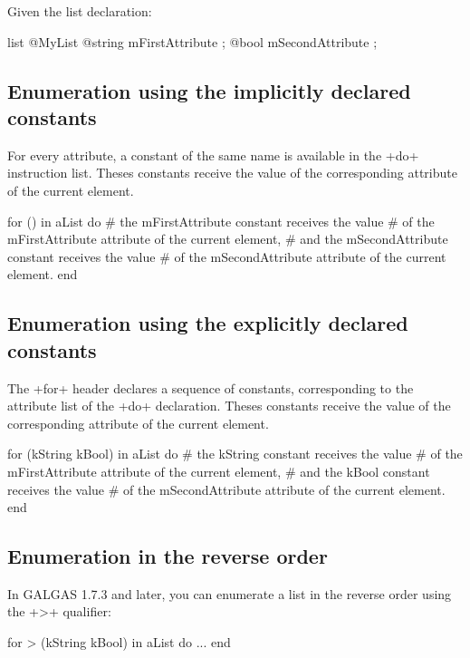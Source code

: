 Given the list declaration:

\begin{galgas}
list @MyList {
  @string mFirstAttribute ;
  @bool mSecondAttribute ;
}
\end{galgas}

\subsection{Enumeration using the implicitly declared constants}

For every attribute, a constant of the same name is available in the \ggs+do+ instruction list. Theses constants receive the value of the corresponding attribute of the current element.

\begin{galgas}
for () in aList do
  # the mFirstAttribute constant receives the value
  # of the mFirstAttribute attribute of the current element,
  # and the mSecondAttribute constant receives the value
  # of the mSecondAttribute attribute of the current element.
end
\end{galgas}

\subsection{Enumeration using the explicitly declared constants}

The \ggs+for+ header declares a sequence of constants, corresponding to the attribute list of the \ggs+do+ declaration. Theses constants receive the value of the corresponding attribute of the current element.


\begin{galgas}
for (kString kBool) in aList do
  # the kString constant receives the value
  # of the mFirstAttribute attribute of the current element,
  # and the kBool constant receives the value
  # of the mSecondAttribute attribute of the current element.
end
\end{galgas}

\subsection{Enumeration in the reverse order}

In GALGAS 1.7.3 and later, you can enumerate a list in the reverse order using the \ggs+>+ qualifier:

\begin{galgas}
for > (kString kBool) in aList do
  ...
end
\end{galgas}





